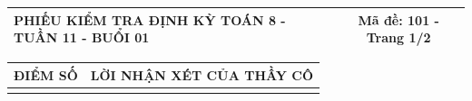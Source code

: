 \documentclass[12pt,a4paper]{article}
\begin{document}
\pagestyle{empty}
\noindent
\begin{tabularx}{\linewidth}{|X|c|}
\hline
\textbf{PHIẾU KIỂM TRA ĐỊNH KỲ TOÁN 8 - TUẦN 11 - BUỔI 01} & \textbf{Mã đề: 101 - Trang 1/2} \\
\hline
\end{tabularx}

\vspace{1.0mm}

\noindent
\begin{tabularx}{\linewidth}{|p{3.2cm}|X|}
\hline
\centering\textbf{ĐIỂM SỐ} & \centering\textbf{LỜI NHẬN XÉT CỦA THẦY CÔ} \tabularnewline
\hline
\rule{0pt}{1.8cm} & \tabularnewline
\hline
\end{tabularx}
\end{document}
